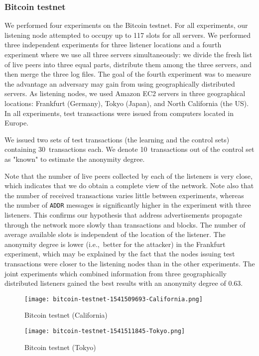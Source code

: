 \subsubsection{Bitcoin testnet}

We performed four experiments on the Bitcoin testnet.
For all experiments, our listening node attempted to occupy up to 117 slots for all servers.
We performed three independent experiments for three listener locations and a fourth experiment where we use all three servers simultaneously: we divide the fresh list of live peers into three equal parts, distribute them among the three servers, and then merge the three log files.
The goal of the fourth experiment was to measure the advantage an adversary may gain from using geographically distributed servers.
As listening nodes, we used Amazon EC2 servers in three geographical locations: Frankfurt (Germany), Tokyo (Japan), and North California (the US).
In all experiments, test transactions were issued from computers located in Europe.

We issued two sets of test transactions (the learning and the control sets) containing 30~transactions each.
We denote 10~transactions out of the control set as "known" to estimate the anonymity degree.

Note that the number of live peers collected by each of the listeners is very close, which indicates that we do obtain a complete view of the network.
Note also that the number of received transactions varies little between experiments, whereas the number of \texttt{ADDR} messages is significantly higher in the experiment with three listeners.
This confirms our hypothesis that address advertisements propagate through the network more slowly than transactions and blocks.
The number of average available slots is independent of the location of the listener.
The anonymity degree is lower (i.e.,~better for the attacker) in the Frankfurt experiment, which may be explained by the fact that the nodes issuing test transactions were closer to the listening nodes than in the other experiments.
The joint experiments which combined information from three geographically distributed listeners gained the best results with an anonymity degree of 0.63.

\begin{figure*}
	\centering
	\begin{minipage}{0.5\textwidth}
		\centering
		\texttt{[image: bitcoin-testnet-1541509693-California.png]}
		\caption{Bitcoin testnet (California)}
	\end{minipage}\hfill
	\begin{minipage}{0.5\textwidth}
		\centering
		\texttt{[image: bitcoin-testnet-1541511845-Tokyo.png]}
		\caption{Bitcoin testnet (Tokyo)}
	\end{minipage}\hfill
	\label{fig:bitcoin-testnet-1}
\end{figure*}


